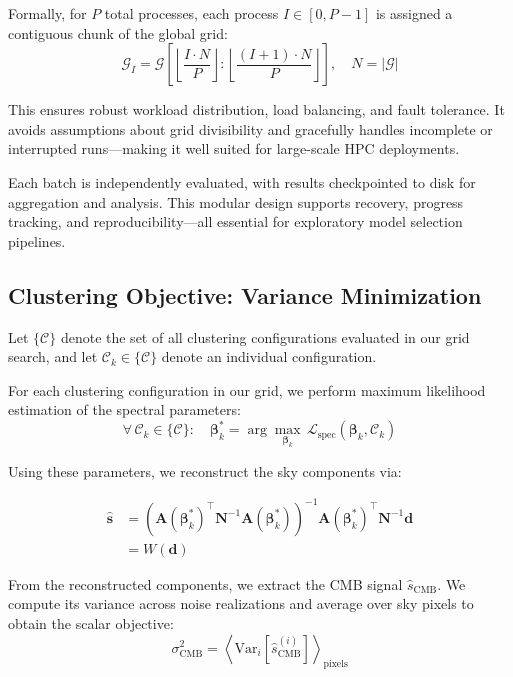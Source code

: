 \documentclass[%
 reprint,
bibnotes,
 amsmath,amssymb,
 aps,
floatfix, 
]{revtex4-2}
\begin{document}
Formally, for \( P \) total processes, each process \( I \in [0, P-1] \) is assigned a contiguous chunk of the global grid:
\[
\mathcal{G}_I = \mathcal{G} \left[ \left\lfloor \frac{I \cdot N}{P} \right\rfloor : \left\lfloor \frac{(I+1) \cdot N}{P} \right\rfloor \right], \quad N = |\mathcal{G}|
\]

This ensures robust workload distribution, load balancing, and fault tolerance. It avoids assumptions about grid divisibility and gracefully handles incomplete or interrupted runs—making it well suited for large-scale HPC deployments.

Each batch is independently evaluated, with results checkpointed to disk for aggregation and analysis. This modular design supports recovery, progress tracking, and reproducibility—all essential for exploratory model selection pipelines.
\subsection{Clustering Objective: Variance Minimization}
\label{subsec:variance_minimization}

Let \(\{\mathcal{C}\}\) denote the set of all clustering configurations evaluated in our grid search, and let \(\mathcal{C}_k \in \{\mathcal{C}\}\) denote an individual configuration.

For each clustering configuration in our grid, we perform maximum likelihood estimation of the spectral parameters:
\begin{equation}
\label{eq:grid_search}
\forall\, \mathcal{C}_k \in \{\mathcal{C}\} : \quad \boldsymbol{\beta}_k^* = \arg \max_{\boldsymbol{\beta}_k} \, \mathcal{L}_{\mathrm{spec}}(\boldsymbol{\beta}_k, \mathcal{C}_k)
\end{equation}

Using these parameters, we reconstruct the sky components via:

\begin{align}
\hat{\mathbf{s}} &= \left( \mathbf{A}(\boldsymbol{\beta}_k^*)^\top \mathbf{N}^{-1} \mathbf{A}(\boldsymbol{\beta}_k^*) \right)^{-1} \mathbf{A}(\boldsymbol{\beta}_k^*)^\top \mathbf{N}^{-1} \mathbf{d} \label{eq:recon_operator} \\
                 &= W(\mathbf{d})
\end{align}

From the reconstructed components, we extract the CMB signal \( \hat{s}_{\mathrm{CMB}} \). We compute its variance across noise realizations and average over sky pixels to obtain the scalar objective:
\begin{equation}
\label{eq:min_var}
    \sigma^2_{\mathrm{CMB}} = \left\langle \mathrm{Var}_{i} \left[ \hat{s}^{(i)}_{\mathrm{CMB}} \right] \right\rangle_{\text{pixels}}
\end{equation}
\end{document}
